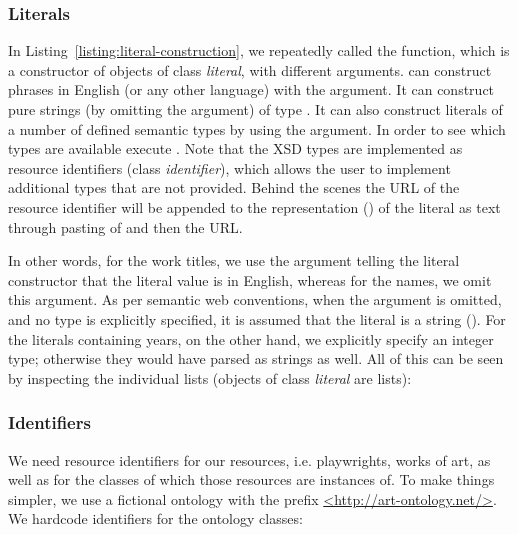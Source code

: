 \subsubsection{Literals}

In Listing~\ref{listing:literal-construction}, we repeatedly called the  function, which is a constructor of objects of class \emph{literal}, with different arguments.  can construct phrases in English (or any other language) with the  argument. It can construct pure strings (by omitting the  argument) of type . It can also construct literals of a number of defined semantic types by using the  argument. In order to see which types are available execute . Note that the XSD types are implemented as resource identifiers (class \emph{identifier}), which allows the user to implement additional types that are not provided. Behind the scenes the URL of the resource identifier will be appended to the representation () of the literal as text through pasting of \cl{\textasciicircum\textasciicircum} and then the URL.



In other words, for the work titles, we use the argument  telling the literal constructor that the literal value is in English, whereas for the names, we omit this argument. As per semantic web conventions, when the argument is omitted, and no type is explicitly specified, it is assumed that the literal is a string (). For the literals containing years, on the other hand, we explicitly specify an integer type; otherwise they would have parsed as strings as well. All of this can be seen by inspecting the individual lists (objects of class \emph{literal} are lists):



\subsubsection{Identifiers}

We need resource identifiers for our resources, i.e. playwrights, works of art, as well as for the classes of which those resources are instances of. To make things simpler, we use a fictional ontology with the prefix \url{<http://art-ontology.net/>}. We hardcode identifiers for the ontology classes:

